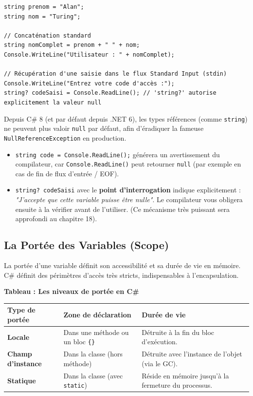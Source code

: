 \begin{lstlisting}[caption={Concaténation et récupération d'entrées}]
string prenom = "Alan";
string nom = "Turing";

// Concaténation standard
string nomComplet = prenom + " " + nom;
Console.WriteLine("Utilisateur : " + nomComplet);

// Récupération d'une saisie dans le flux Standard Input (stdin)
Console.WriteLine("Entrez votre code d'accès :");
string? codeSaisi = Console.ReadLine(); // 'string?' autorise explicitement la valeur null
\end{lstlisting}

\begin{tcolorbox}[colback=backcolour,colframe=keywordcolor,title=\textbf{Note sur \texttt{string?} et les \textit{Nullable Reference Types}}]
Depuis C\# 8 (et par défaut depuis .NET 6), les types références (comme \texttt{string}) ne peuvent plus valoir \texttt{null} par défaut, afin d'éradiquer la fameuse \texttt{NullReferenceException} en production.
\begin{itemize}
    \item \texttt{string code = Console.ReadLine();} générera un avertissement du compilateur, car \texttt{Console.ReadLine()} peut retourner \texttt{null} (par exemple en cas de fin de flux d'entrée / EOF).
    \item \texttt{string? codeSaisi} avec le \textbf{point d'interrogation} indique explicitement : \textit{"J'accepte que cette variable puisse être nulle"}. Le compilateur vous obligera ensuite à la vérifier avant de l'utiliser. (Ce mécanisme très puissant sera approfondi au chapitre 18).
\end{itemize}
\end{tcolorbox}

\subsection{La Portée des Variables (Scope)}

La portée d'une variable définit son accessibilité et sa durée de vie en mémoire. C\# définit des périmètres d'accès très stricts, indispensables à l'encapsulation.

\begin{center}
    \textbf{Tableau : Les niveaux de portée en C\#} \\[0.3cm]
    \begin{tabular}{@{}lp{5cm}p{5.5cm}@{}}
        \toprule
        \textbf{Type de portée} & \textbf{Zone de déclaration} & \textbf{Durée de vie} \\
        \midrule
        \textbf{Locale} & Dans une méthode ou un bloc \texttt{\{\}} & Détruite à la fin du bloc d'exécution. \\
        \textbf{Champ d'instance} & Dans la classe (hors méthode) & Détruite avec l'instance de l'objet (via le GC). \\
        \textbf{Statique} & Dans la classe (avec \texttt{static}) & Réside en mémoire jusqu'à la fermeture du processus. \\
        \bottomrule
    \end{tabular}
\end{center}

